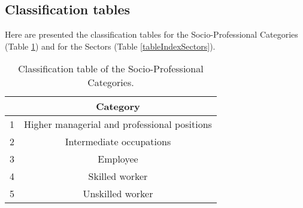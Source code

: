 \documentclass[]{article}
\begin{document}
\subsection{Classification tables}\label{classification-tables}

Here are presented the classification tables for the Socio-Professional
Categories (Table \ref{tableIndexSpc}) and for the Sectors (Table
\ref{tableIndexSectors}).

\begin{table}[H]
\centering
\begin{tabular}{cc}
  \hline
 & Category \\ 
  \hline
1 & Higher managerial and professional positions  \\ 
  2 & Intermediate occupations \\ 
  3 & Employee \\ 
  4 & Skilled worker \\ 
  5 & Unskilled worker \\ 
   \hline
\end{tabular}
\caption{Classification table of the Socio-Professional Categories. \label{tableIndexSpc}} 
\end{table}
\end{document}
